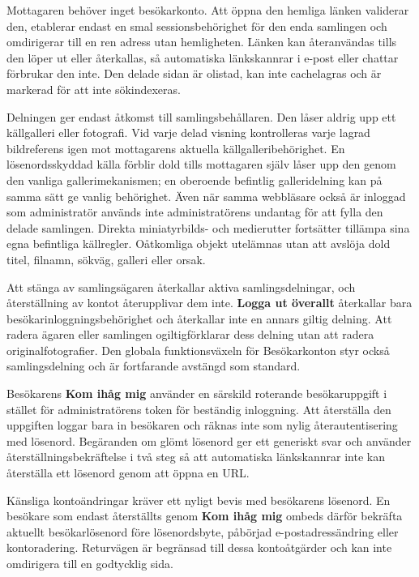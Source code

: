 \documentclass[11pt,a4paper]{article}
\newcommand{\ui}[1]{\textbf{#1}}
\begin{document}
Mottagaren behöver inget besökarkonto. Att öppna den hemliga länken validerar
den, etablerar endast en smal sessionsbehörighet för den enda samlingen och
omdirigerar till en ren adress utan hemligheten. Länken kan återanvändas tills
den löper ut eller återkallas, så automatiska länkskannrar i e-post eller
chattar förbrukar den inte. Den delade sidan är olistad, kan inte cachelagras
och är markerad för att inte sökindexeras.

Delningen ger endast åtkomst till samlingsbehållaren. Den låser aldrig upp ett
källgalleri eller fotografi. Vid varje delad visning kontrolleras varje lagrad
bildreferens igen mot mottagarens aktuella källgalleribehörighet. En
lösenordsskyddad källa förblir dold tills mottagaren själv låser upp den genom
den vanliga gallerimekanismen; en oberoende befintlig galleridelning kan på
samma sätt ge vanlig behörighet. Även när samma webbläsare också är inloggad som
administratör används inte administratörens undantag för att fylla den delade
samlingen. Direkta miniatyrbilds- och medierutter fortsätter tillämpa sina egna
befintliga källregler. Oåtkomliga objekt utelämnas utan att avslöja dold titel,
filnamn, sökväg, galleri eller orsak.

Att stänga av samlingsägaren återkallar aktiva samlingsdelningar, och
återställning av kontot återupplivar dem inte. \ui{Logga ut överallt} återkallar
bara besökarinloggningsbehörighet och återkallar inte en annars giltig delning.
Att radera ägaren eller samlingen ogiltigförklarar dess delning utan att radera
originalfotografier. Den globala funktionsväxeln för Besökarkonton styr också
samlingsdelning och är fortfarande avstängd som standard.

Besökarens \ui{Kom ihåg mig} använder en särskild roterande besökaruppgift i
stället för administratörens token för beständig inloggning. Att återställa den
uppgiften loggar bara in besökaren och räknas inte som nylig återautentisering
med lösenord. Begäranden om glömt lösenord ger ett generiskt svar och använder
återställningsbekräftelse i två steg så att automatiska länkskannrar inte kan
återställa ett lösenord genom att öppna en URL.

Känsliga kontoändringar kräver ett nyligt bevis med besökarens lösenord. En
besökare som endast återställts genom \ui{Kom ihåg mig} ombeds därför bekräfta
aktuellt besökarlösenord före lösenordsbyte, påbörjad e-postadressändring eller
kontoradering. Returvägen är begränsad till dessa kontoåtgärder och kan inte
omdirigera till en godtycklig sida.
\end{document}
